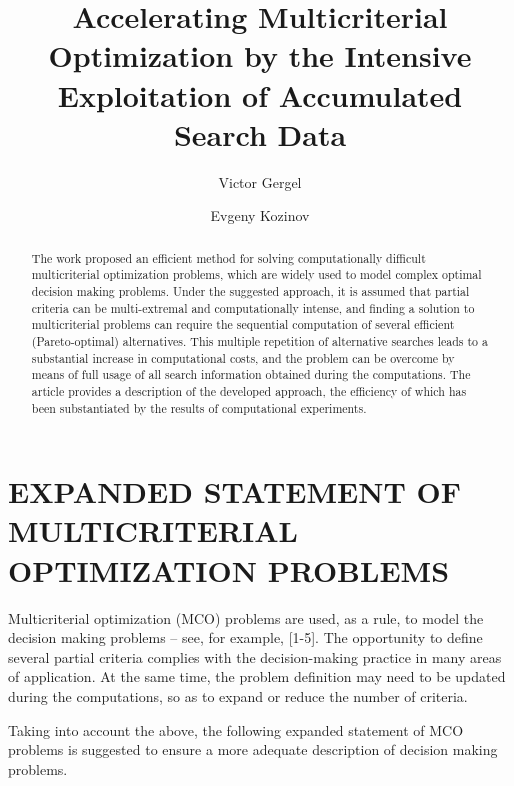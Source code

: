 \documentclass{aip-cp}
\begin{document}
\title{Accelerating Multicriterial Optimization by the Intensive Exploitation of Accumulated Search Data}
\author[aff1]{Victor Gergel}
\author[aff1]{Evgeny Kozinov}


\maketitle



\begin{abstract}
The work proposed an efficient method for solving computationally difficult multicriterial optimization problems, which are widely used to model complex optimal decision making problems. Under the suggested approach, it is assumed that partial criteria can be multi-extremal and computationally intense, and finding a solution to multicriterial problems can require the sequential computation of several efficient (Pareto-optimal) alternatives. This multiple repetition of alternative searches leads to a substantial increase in computational costs, and the problem can be overcome by means of full usage of all search information obtained during the computations. The article provides a description of the developed approach, the efficiency of which has been substantiated by the results of computational experiments. 
\end{abstract}

\section{EXPANDED STATEMENT OF MULTICRITERIAL OPTIMIZATION PROBLEMS}
Multicriterial optimization (MCO) problems are used, as a rule, to model the decision making problems – see, for example, [1-5]. The opportunity to define several partial criteria complies with the decision-making practice in many areas of application. At the same time, the problem definition may need to be updated during the computations, so as to expand or reduce the number of criteria. \par

Taking into account the above, the following expanded statement of MCO problems is suggested to ensure a more adequate description of decision making problems. \par
\end{document}

